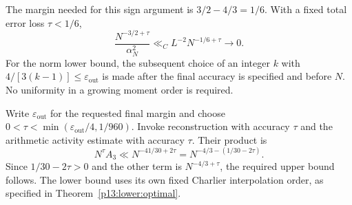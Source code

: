 The margin needed for this sign argument is
$3/2-4/3=1/6$. With a fixed total error loss $\tau<1/6$,
\[
 \frac{N^{-3/2+\tau}}{\alpha_N^2}
 \ll_C L^{-2}N^{-1/6+\tau}\longrightarrow0.
\]
For the norm lower bound, the subsequent choice of an integer $k$ with
$4/[3(k-1)]\leq\varepsilon_{\mathrm{out}}$ is made after the final
accuracy is specified and before $N$. No uniformity in a growing
moment order is required.

Write $\varepsilon_{\mathrm{out}}$ for the requested final margin and
choose $0<\tau<\min(\varepsilon_{\mathrm{out}}/4,1/960)$.
Invoke reconstruction with accuracy $\tau$ and the arithmetic activity
estimate with accuracy $\tau$. Their product is
\[
 N^\tau A_3\ll N^{-41/30+2\tau}
     =N^{-4/3-(1/30-2\tau)}.
\]
Since $1/30-2\tau>0$ and the other term is
$N^{-4/3+\tau}$, the required upper bound follows.
The lower bound uses its own fixed Charlier interpolation order,
as specified in Theorem~\ref{p13:lower:optimal}.
